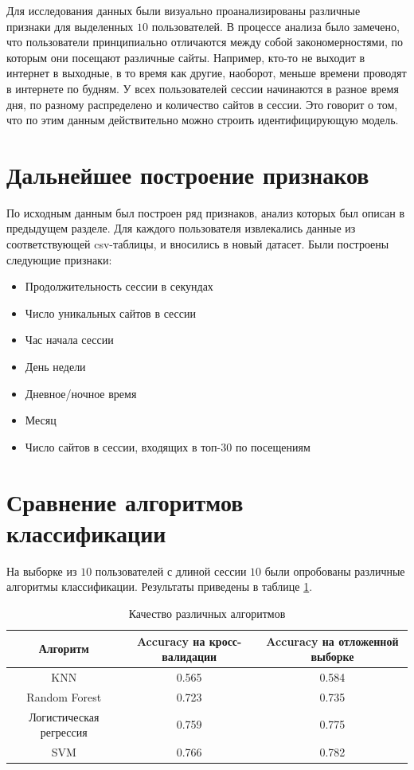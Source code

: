 \documentclass[12pt,a4paper]{article}
\theoremstyle{plain}
\theoremstyle{definition}
\theoremstyle{remark}
\renewcommand{\%}[1]{\,\text{mod} \,#1}
\begin{document}
	Для исследования данных были визуально проанализированы различные признаки для выделенных $10$ пользователей. В процессе анализа было замечено, что пользователи принципиально отличаются между собой закономерностями, по которым они посещают различные сайты. Например, кто-то не выходит в интернет в выходные, в то время как другие, наоборот, меньше времени проводят в интернете по будням. У всех пользователей сессии начинаются в разное время дня, по разному распределено и количество сайтов в сессии. Это говорит о том, что по этим данным действительно можно строить идентифицирующую модель.
	\section{Дальнейшее построение признаков}
	По исходным данным был построен ряд признаков, анализ которых был описан в предыдущем разделе. Для каждого пользователя извлекались данные из соответствующей csv-таблицы, и вносились в новый датасет. Были построены следующие признаки:
	\begin{multicols}{2}
		\begin{itemize}
			\item Продолжительность сессии в секундах
			\item Число уникальных сайтов в сессии
			\item Час начала сессии
			\item День недели
			\item Дневное/ночное время
			\item Месяц
			\item Число сайтов в сессии, входящих в топ-$30$ по посещениям
		\end{itemize}
	\end{multicols}
	\section{Сравнение алгоритмов классификации}
	На выборке из $10$ пользователей с длиной сессии $10$ были опробованы различные алгоритмы классификации. Результаты приведены в таблице \ref{table1}.
	\begin{table}[h!]
		\centering
		\begin{tabular}{|c|c|c|}
			\hline
			Алгоритм                & Accuracy на кросс-валидации & Accuracy на отложенной выборке \\ \hline
			KNN                     & 0.565                       & 0.584                          \\ \hline
			Random Forest           & 0.723                       & 0.735                          \\ \hline
			Логистическая регрессия & 0.759                       & 0.775                          \\ \hline
			SVM                     & 0.766                       & 0.782                          \\ \hline
		\end{tabular}
	\caption{Качество различных алгоритмов}\label{table1}
	\end{table}
\end{document}
